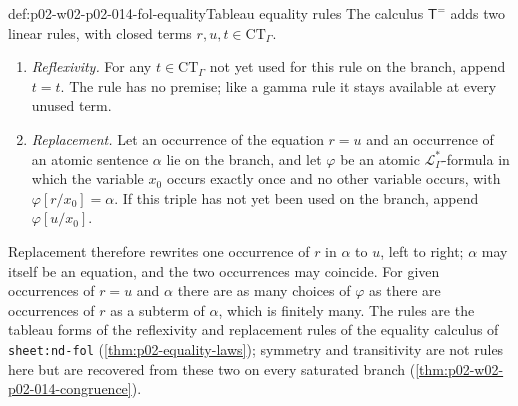 \begin{hbdefinition}{def:p02-w02-p02-014-fol-equality}{Tableau equality rules}
The calculus \(\mathsf T^{=}\) adds two linear rules, with closed terms
\(r,u,t\in\mathrm{CT}_{\Gamma}\).
\begin{enumerate}
  \item \emph{Reflexivity.}  For any \(t\in\mathrm{CT}_{\Gamma}\) not yet
        used for this rule on the branch, append \(t=t\).  The rule has no
        premise; like a gamma rule it stays available at every unused term.
  \item \emph{Replacement.}  Let an occurrence of the equation \(r=u\) and an
        occurrence of an atomic sentence \(\alpha\) lie on the branch, and let
        \(\varphi\) be an atomic \(\mathcal L_{\Gamma}^{*}\)-formula in which
        the variable \(x_0\) occurs exactly once and no other variable
        occurs, with \(\varphi[r/x_0]=\alpha\).  If this triple has not yet
        been used on the branch, append \(\varphi[u/x_0]\).
\end{enumerate}
Replacement therefore rewrites one occurrence of \(r\) in \(\alpha\) to
\(u\), left to right; \(\alpha\) may itself be an equation, and the two
occurrences may coincide.  For given occurrences of \(r=u\) and
\(\alpha\) there are as many choices of \(\varphi\) as there are
occurrences of \(r\) as a subterm of \(\alpha\), which is finitely many.
The rules are the tableau forms of the reflexivity and replacement rules of
the equality calculus of \texttt{sheet:\allowbreak nd-fol}
(\cref{thm:p02-equality-laws}); symmetry and transitivity are not rules here
but are recovered from these two on every saturated branch
(\cref{thm:p02-w02-p02-014-congruence}).
\end{hbdefinition}

